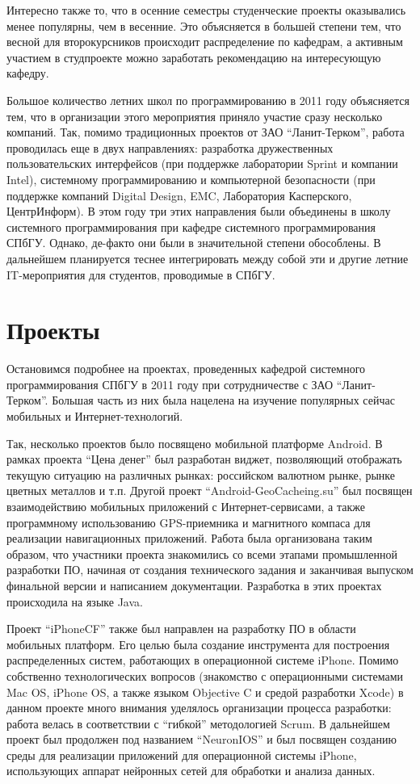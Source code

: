 \documentclass[a4paper]{article}
\begin{document}
Интересно также то, что в осенние семестры студенческие проекты оказывались менее популярны, чем в весенние. Это объясняется в большей степени тем, что весной для второкурсников происходит распределение по кафедрам, а активным участием в студпроекте можно заработать рекомендацию на интересующую кафедру. 

Большое количество летних школ по программированию в 2011 году объясняется тем, что в организации этого мероприятия приняло участие сразу несколько компаний. Так, помимо традиционных проектов от ЗАО ``Ланит-Терком'', работа проводилась еще в двух направлениях: разработка дружественных пользовательских интерфейсов (при поддержке лаборатории Sprint и компании Intel), системному программированию и компьютерной безопасности (при поддержке компаний Digital Design, EMC, Лаборатория Касперского, ЦентрИнформ). В этом году три этих направления были объединены в школу системного программирования при кафедре системного программирования СПбГУ. Однако, де-факто они были в значительной степени обособлены. В дальнейшем планируется теснее интегрировать между собой эти и другие летние IT-мероприятия для студентов, проводимые в СПбГУ.

\section{Проекты}

Остановимся подробнее на проектах, проведенных кафедрой системного программирования СПбГУ в 2011 году при сотрудничестве с ЗАО ``Ланит-Терком''. Большая часть из них была нацелена на изучение популярных сейчас мобильных и Интернет-технологий.

Так, несколько проектов было посвящено мобильной платформе Android. В рамках проекта ``Цена денег'' был разработан виджет, позволяющий отображать текущую ситуацию на различных рынках: российском валютном рынке, рынке цветных металлов и т.п. Другой проект ``Android-GeoCacheing.su'' был посвящен взаимодействию мобильных приложений с Интернет-сервисами, а также программному использованию GPS-приемника и магнитного компаса для реализации навигационных приложений. Работа была организована таким образом, что участники проекта знакомились со всеми этапами промышленной разработки ПО, начиная от создания технического задания и заканчивая выпуском финальной версии и написанием документации. Разработка в этих проектах происходила на языке Java. 

Проект ``iPhoneCF'' также был направлен на разработку ПО в области мобильных платформ. Его целью была создание инструмента для построения распределенных систем, работающих в операционной системе iPhone. Помимо собственно технологических вопросов (знакомство с операционными системами Mac OS, iPhone OS, а также языком Objective C и средой разработки Xcode) в данном проекте много внимания уделялось организации процесса разработки: работа велась в соответствии с ``гибкой'' методологией Scrum. В дальнейшем проект был продолжен под названием ``NeuronIOS'' и был посвящен созданию среды для реализации приложений для операционной системы iPhone, использующих аппарат нейронных сетей для обработки и анализа данных.
\end{document}

